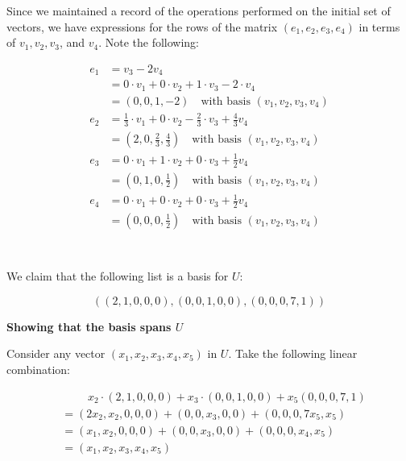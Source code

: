 \documentclass{article}
\begin{document}
Since we maintained a record of the operations performed on the initial set of vectors, we have expressions for the rows of the matrix $(e_1, e_2, e_3, e_4)$ in terms of $v_1, v_2, v_3$, and $v_4$. Note the following:

\begin{align*}
    e_1 & = v_3 - 2v_4                                                                                \\
        & = 0 \cdot v_1 + 0 \cdot v_2 + 1 \cdot v_3 - 2 \cdot v_4                                     \\
        & = (0, 0, 1, -2) \quad \text{with basis } (v_1, v_2, v_3, v_4)                               \\[1em]
    e_2 & = \frac{1}{3} \cdot v_1 + 0 \cdot v_2 - \frac{2}{3} \cdot v_3 + \frac{4}{3}v_4              \\
        & = \left(2, 0, \frac{2}{3}, \frac{4}{3}\right) \quad \text{with basis } (v_1, v_2, v_3, v_4) \\[1em]
    e_3 & = 0 \cdot v_1 + 1 \cdot v_2 + 0 \cdot v_3 + \frac{1}{2}v_4                                  \\
        & = \left(0, 1, 0, \frac{1}{2}\right) \quad \text{with basis } (v_1, v_2, v_3, v_4)           \\[1em]
    e_4 & = 0 \cdot v_1 + 0 \cdot v_2 + 0 \cdot v_3 + \frac{1}{2}v_4                                  \\
        & = \left(0, 0, 0, \frac{1}{2}\right) \quad \text{with basis } (v_1, v_2, v_3, v_4)           \\[1em]
\end{align*}

\newpage
\section{}

We claim that the following list is a basis for $U$:

\[\left((2, 1, 0, 0, 0), (0, 0, 1, 0, 0), (0, 0, 0, 7, 1) \right)\]

\textbf{Showing that the basis spans $U$}

Consider any vector $(x_1, x_2, x_3, x_4, x_5)$ in $U$. Take the following linear combination:

\begin{align*}
     & \phantom{= \quad} x_2 \cdot (2, 1, 0, 0, 0) + x_3 \cdot (0, 0, 1, 0, 0) + x_5 (0, 0, 0, 7, 1) \\
     & = (2x_2, x_2, 0, 0, 0) + (0, 0, x_3, 0, 0) + (0, 0, 0, 7x_5, x_5)                             \\
     & = (x_1, x_2, 0, 0, 0) + (0, 0, x_3, 0, 0) + (0, 0, 0, x_4, x_5)                               \\
     & = (x_1, x_2, x_3, x_4, x_5)                                                                   \\
\end{align*}
\end{document}
